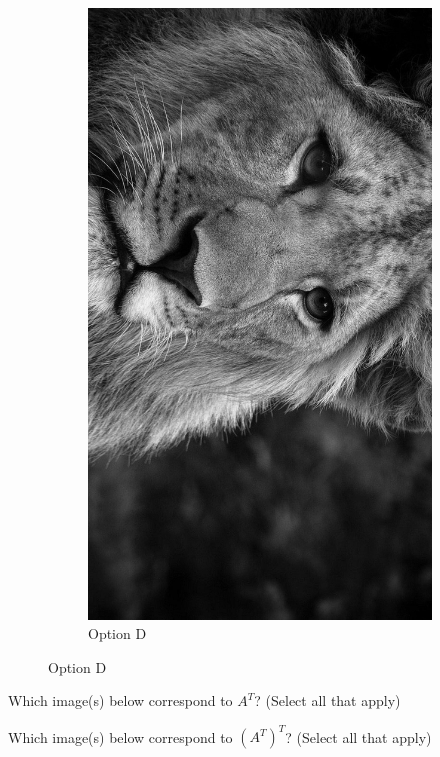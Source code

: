 \documentclass{ximera}
\begin{document}
\begin{problem}
\begin{figure}[h]
\begin{subfigure}[b]{0.35\textwidth}
    \includegraphics[width=\textwidth]{test_image_rot_3.jpg}
    \caption{Option D}
    \label{fig:optionD}
  \end{subfigure}
\end{figure}

Which image(s) below correspond to $A^T$? (Select all that apply)

\begin{selectAll}


\end{selectAll}

Which image(s) below correspond to $(A^T)^T$? (Select all that apply)

\begin{selectAll}


\end{selectAll}


\end{problem}
\end{document}
